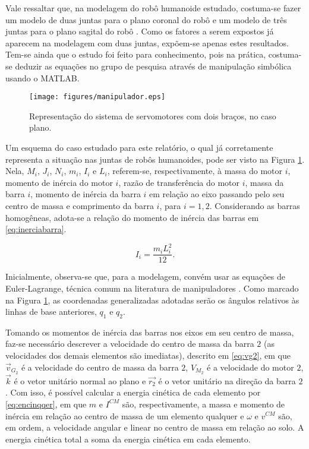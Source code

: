 Vale ressaltar que, na modelagem do robô humanoide estudado, costuma-se fazer um modelo de duas juntas para o plano coronal do robô e um modelo de três juntas para o plano sagital do robô \cite{tesemarcos}. Como os fatores a serem expostos já aparecem na modelagem com duas juntas, expõem-se apenas estes resultados. Tem-se ainda que o estudo foi feito para conhecimento, pois na prática, costuma-se deduzir as equações no grupo de pesquisa através de manipulação simbólica usando o MATLAB.

\begin{figure}
\centering
\texttt{[image: figures/manipulador.eps]}
\caption{Representação do sistema de servomotores com dois braços, no caso plano.}
\label{fig:manipulador}
\end{figure}

Um esquema do caso estudado para este relatório, o qual já corretamente representa a situação nas juntas de robôs humanoides, pode ser visto na Figura \ref{fig:manipulador}. Nela, $M_i$, $J_i$, $N_i$, $m_i$, $I_i$ e $L_i$, referem-se, respectivamente, à massa do motor $i$, momento de inércia do motor $i$, razão de transferência do motor $i$, massa da barra $i$, momento de inércia da barra $i$ em relação ao eixo passando pelo seu centro de massa e comprimento da barra $i$, para $i = 1,2$. Considerando as barras homogêneas, adota-se a relação do momento de inércia das barras em \eqref{eq:inerciabarra}.

\begin{equation}
\label{eq:inerciabarra}
I_i = \frac{m_i L_i^2}{12}.
\end{equation}

Inicialmente, observa-se que, para a modelagem, convém usar as equações de Euler-Lagrange, técnica comum na literatura de manipuladores \cite{craig1986}. Como marcado na Figura \ref{fig:manipulador}, as coordenadas generalizadas adotadas serão os ângulos relativos às linhas de base anteriores, $q_1$ e $q_2$.

Tomando os momentos de inércia das barras nos eixos em seu centro de massa, faz-se necessário descrever a velocidade do centro de massa da barra $2$ (as velocidades dos demais elementos são imediatas), descrito em \ref{eq:vg2}, em que $\vec{v}_{G_2}$ é a velocidade do centro de massa da barra $2$, $V_{M_2}$ é a velocidade do motor $2$, $\vec{k}$ é o vetor unitário normal ao plano e $\vec{r_2}$ é o vetor unitário na direção da barra $2$. Com isso, é possível calcular a energia cinética de cada elemento por \eqref{eq:encinqqer}, em que $m$ e $I^{CM}$ são, respectivamente, a massa e momento de inércia em relação ao centro de massa de um elemento qualquer e $\omega$ e $v^{CM}$ são, em ordem, a velocidade angular e linear no centro de massa em relação ao solo. A energia cinética total a soma da energia cinética em cada elemento. 


